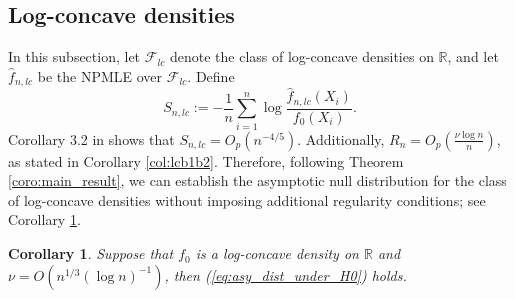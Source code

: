 \documentclass[12pt,letterpaper, twoside, openany]{article}
\theoremstyle{plain}
\newtheorem{corollary}[theorem]{Corollary}
\begin{document}
\subsection{Log-concave densities}\label{subsect:lc_log_density_ratio}
		In this subsection, let $\mathcal{F}_{lc}$ denote the class of log-concave densities on $\mathbb{R}$, and let $\hat{f}_{n,lc}$ be the NPMLE over $\mathcal{F}_{lc}$. Define
		\begin{equation*}
			S_{n,lc} := - \frac{1}{n} \sum^n_{i=1} \log \frac{\hat{f}_{n,lc}(X_i)}{f_0(X_i)}.
		\end{equation*}
		Corollary 3.2 in \cite{doss2016global} shows that $S_{n,lc} = O_p(n^{-4/5})$. Additionally, $R_n = O_p\left(\frac{\nu \log n}{n}\right)$, as stated in Corollary \ref{col:lcb1b2}.  Therefore, following Theorem \ref{coro:main_result}, we can establish the asymptotic null distribution for the class of log-concave densities without imposing additional regularity conditions; see Corollary \ref{cor:null_dist_log_concave}.
		\begin{corollary}\label{cor:null_dist_log_concave}
			Suppose that $f_0$ is a log-concave density on $\mathbb{R}$ and $\nu = O(n^{1/3}(\log n)^{-1})$, then (\ref{eq:asy_dist_under_H0}) holds.
				
			
			
		\end{corollary}
		
\end{document}
